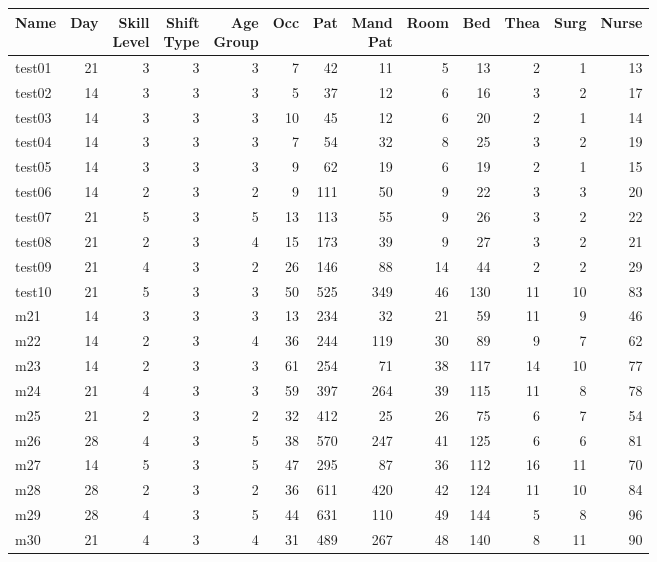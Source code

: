 {\scriptsize
\begin{tabular}{lrrrrrrrrrrrr}\toprule
Name &Day &\shortstack{Skill\\Level} &\shortstack{Shift\\Type} &\shortstack{Age\\Group} &Occ &Pat &\shortstack{Mand\\Pat} &Room &Bed &Thea &Surg &Nurse \\ \midrule
test01&21&3&3&3&7&42&11&5&13&2&1&13\\ 
test02&14&3&3&3&5&37&12&6&16&3&2&17\\ 
test03&14&3&3&3&10&45&12&6&20&2&1&14\\ 
test04&14&3&3&3&7&54&32&8&25&3&2&19\\ 
test05&14&3&3&3&9&62&19&6&19&2&1&15\\ 
test06&14&2&3&2&9&111&50&9&22&3&3&20\\ 
test07&21&5&3&5&13&113&55&9&26&3&2&22\\ 
test08&21&2&3&4&15&173&39&9&27&3&2&21\\ 
test09&21&4&3&2&26&146&88&14&44&2&2&29\\ 
\rowcolor{green!10}test10&21&5&3&3&50&525&349&46&130&11&10&83\\ 
m21&14&3&3&3&13&234&32&21&59&11&9&46\\ 
m22&14&2&3&4&36&244&119&30&89&9&7&62\\ 
m23&14&2&3&3&61&254&71&38&117&14&10&77\\ 
m24&21&4&3&3&59&397&264&39&115&11&8&78\\ 
m25&21&2&3&2&32&412&25&26&75&6&7&54\\ 
m26&28&4&3&5&38&570&247&41&125&6&6&81\\ 
m27&14&5&3&5&47&295&87&36&112&16&11&70\\ 
m28&28&2&3&2&36&611&420&42&124&11&10&84\\ 
\rowcolor{green!10}m29&28&4&3&5&44&631&110&49&144&5&8&96\\ 
m30&21&4&3&4&31&489&267&48&140&8&11&90\\ 
\bottomrule
\end{tabular}
}